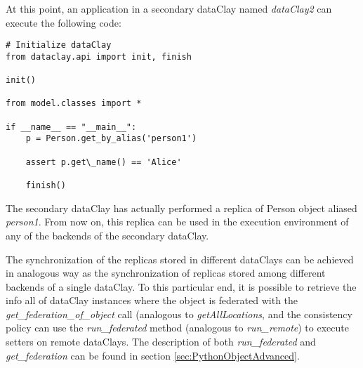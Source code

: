 At this point, an application in a secondary dataClay named \textit{dataClay2} can execute the following code:

\begin{tBox}
\begin{lstlisting}
# Initialize dataClay
from dataclay.api import init, finish

init()

from model.classes import *

if __name__ == "__main__":
    p = Person.get_by_alias('person1')
    
    assert p.get\_name() == 'Alice'
    
    finish()
\end{lstlisting}
\end{tBox}

The secondary dataClay has actually performed a replica of Person object aliased \textit{person1}. From now on, this 
replica can be used in the execution environment of any of the backends of the secondary dataClay.

The synchronization of the replicas stored in different dataClays can be achieved in analogous way as the synchronization 
of replicas stored among different backends of a single dataClay. To this particular end, it is possible to retrieve the info
all of dataClay instances where the object is federated with the \textit{get\_federation\_of\_object} call (analogous to \textit{getAllLocations}, 
and the consistency policy can use the \textit{run\_federated} method (analogous to \textit{run\_remote}) to execute setters on remote dataClays.
The description of both \textit{run\_federated} and \textit{get\_federation} can be found in section \ref{sec:PythonObjectAdvanced}.